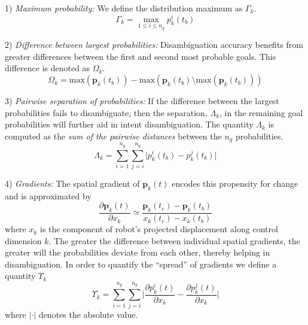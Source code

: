 \documentclass[natbib, twocolumn]{svjour3}          %
\begin{document}
1) \textit{Maximum probability:}  We define the distribution maximum as $\Gamma_k$.
\begin{equation}
\Gamma_k = \max\limits_{1 \leq i \leq n_g}p^i_k(t_b)
\end{equation}

2) \textit{Difference between largest probabilities:} Disambiguation accuracy benefits from greater differences between the first and second most probable goals. This difference is denoted as $\Omega_k$.
\begin{equation}
\Omega_k = \text{max}(\boldsymbol{p}_k(t_b)) - \text{max}(\boldsymbol{p}_k(t_b) \setminus \text{max}(\boldsymbol{p}_k(t_b)))
\end{equation}

3) \textit{Pairwise separation of probabilities:} If the difference between the largest probabilities fails to disambiguate, then the separation, $\Lambda_k$, in the remaining goal probabilities will further aid in intent disambiguation. The quantity $\Lambda_k$ is computed as the \textit{sum of the pairwise distances} between the $n_g$ probabilities.
\begin{equation}
\Lambda_k = \sum_{i=1}^{n_g}\sum_{j=i}^{n_g}\lvert p^i_k(t_b) - p^j_k(t_b)\rvert
\end{equation}

4) \textit{Gradients:} The spatial gradient of $\boldsymbol{p}_k(t)$ encodes this propensity for change and is approximated by 
\begin{equation*}
\frac{\partial\boldsymbol{p}_k(t)}{\partial x_k} \simeq \frac{\boldsymbol{p}_k(t_c) - \boldsymbol{p}_k(t_b)}{x_k(t_c) - x_k(t_b)}
\end{equation*}
where $x_k$ is the component of robot's projected displacement along control dimension $k$. The greater the difference between individual spatial gradients, the greater will the probabilities deviate from each other, thereby helping in disambiguation. In order to quantify the ``spread'' of gradients we define a quantity $\Upsilon_k$ 
\begin{equation}
\Upsilon_k = \sum_{i=1}^{n_g}\sum_{j=i}^{n_g}\Big \lvert\frac{\partial p^i_k(t)}{\partial x_k} - \frac{\partial p^j_k(t)}{\partial x_k}\Big \rvert
\end{equation}
where $\lvert\cdot\rvert$ denotes the absolute value. 
\end{document}
